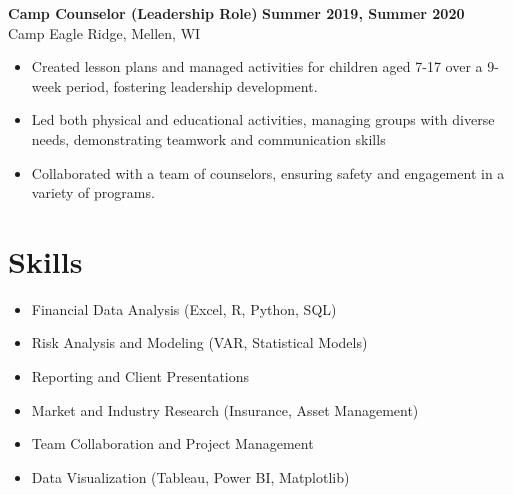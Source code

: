 \documentclass[10pt]{article}
\begin{document}
\vspace{0pt}
\textbf{Camp Counselor (Leadership Role)} \hfill \textbf{Summer 2019, Summer 2020} \\
Camp Eagle Ridge, Mellen, WI \\
\begin{itemize}[noitemsep,nosep]
    \item Created lesson plans and managed activities for children aged 7-17 over a 9-week period, fostering leadership development.
    \item Led both physical and educational activities, managing groups with diverse needs, demonstrating teamwork and communication skills
    \item Collaborated with a team of counselors, ensuring safety and engagement in a variety of programs.
\end{itemize}

\vspace{-10pt}
\section*{Skills}
\vspace{0pt}
\begin{multicols}{2}
\begin{itemize}[noitemsep,nosep]
    \item Financial Data Analysis (Excel, R, Python, SQL)
    \item Risk Analysis and Modeling (VAR, Statistical Models)
    \item Reporting and Client Presentations
    \item Market and Industry Research (Insurance, Asset Management)
    \item Team Collaboration and Project Management
    \item Data Visualization (Tableau, Power BI, Matplotlib)
\end{itemize}
\end{multicols}
\end{document}
